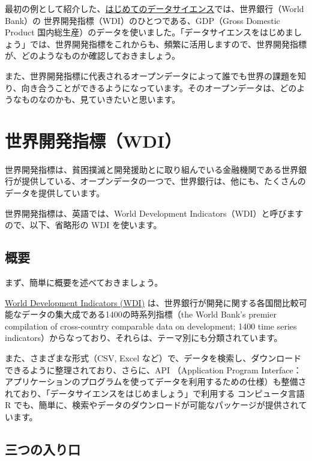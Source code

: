 \documentclass[
  xelatex, ja=standard]{bxjsbook}
\theoremstyle{definition}
\theoremstyle{definition}
\theoremstyle{definition}
\theoremstyle{definition}
\theoremstyle{remark}
\begin{document}
最初の例として紹介した、\href{https://icu-hsuzuki.github.io/ds4aj/first-example.html\#first-example}{はじめてのデータサイエンス}では、世界銀行（World Bank）の 世界開発指標（WDI）のひとつである、GDP（Gross Domestic Product 国内総生産）のデータを使いました。「データサイエンスをはじめましょう」では、世界開発指標をこれからも、頻繁に活用しますので、世界開発指標が、どのようなものか確認しておきましょう。

また、世界開発指標に代表されるオープンデータによって誰でも世界の課題を知り、向き合うことができるようになっています。そのオープンデータは、どのようなものなのかも、見ていきたいと思います。

\hypertarget{ux4e16ux754cux958bux767aux6307ux6a19wdi}{%
\section{世界開発指標（WDI）}\label{ux4e16ux754cux958bux767aux6307ux6a19wdi}}

世界開発指標は、貧困撲滅と開発援助とに取り組んでいる金融機関である世界銀行が提供している、オープンデータの一つで、世界銀行は、他にも、たくさんのデータを提供しています。

世界開発指標は、英語では、World Development Indicators（WDI）と呼びますので、以下、省略形の WDI を使います。

\hypertarget{ux6982ux8981}{%
\subsection{概要}\label{ux6982ux8981}}

まず、簡単に概要を述べておきましょう。

\href{https://datatopics.worldbank.org/world-development-indicators/}{World Development Indicators (WDI)} は、世界銀行が開発に関する各国間比較可能なデータの集大成である1400の時系列指標（the World Bank's premier compilation of cross-country comparable data on development; 1400 time series indicators）からなっており、それらは、テーマ別にも分類されています。

また、さまざまな形式（CSV, Excel など）で、データを検索し、ダウンロードできるように整理されており、さらに、API （Application Program Interface：アプリケーションのプログラムを使ってデータを利用するための仕様）も整備されており、「データサイエンスをはじめましょう」で利用する コンピュータ言語 R でも、簡単に、検索やデータのダウンロードが可能なパッケージが提供されています。

\hypertarget{ux4e09ux3064ux306eux5165ux308aux53e3}{%
\subsection{三つの入り口}\label{ux4e09ux3064ux306eux5165ux308aux53e3}}
\end{document}
